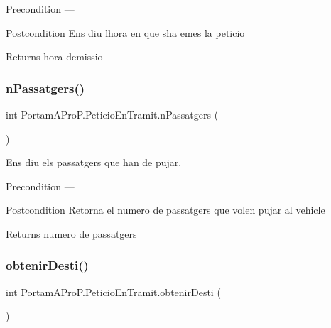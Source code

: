 \begin{DoxyPrecond}{Precondition}
--- 
\end{DoxyPrecond}
\begin{DoxyPostcond}{Postcondition}
Ens diu l\textquotesingle{}hora en que s\textquotesingle{}ha emes la peticio 
\end{DoxyPostcond}
\begin{DoxyReturn}{Returns}
hora d\textquotesingle{}emissio 
\end{DoxyReturn}
\mbox{\label{class_portam_a_pro_p_1_1_peticio_en_tramit_a544db471b12c35d6b8c234be757d84d3}} 
\subsubsection{\texorpdfstring{n\+Passatgers()}{nPassatgers()}}
{\footnotesize\ttfamily int Portam\+A\+Pro\+P.\+Peticio\+En\+Tramit.\+n\+Passatgers (\begin{DoxyParamCaption}{ }\end{DoxyParamCaption})}



Ens diu els passatgers que han de pujar. 

\begin{DoxyPrecond}{Precondition}
--- 
\end{DoxyPrecond}
\begin{DoxyPostcond}{Postcondition}
Retorna el numero de passatgers que volen pujar al vehicle 
\end{DoxyPostcond}
\begin{DoxyReturn}{Returns}
numero de passatgers 
\end{DoxyReturn}
\mbox{\label{class_portam_a_pro_p_1_1_peticio_en_tramit_a7ab6e34a00489297a71dbe9ccae4aa51}} 
\subsubsection{\texorpdfstring{obtenir\+Desti()}{obtenirDesti()}}
{\footnotesize\ttfamily int Portam\+A\+Pro\+P.\+Peticio\+En\+Tramit.\+obtenir\+Desti (\begin{DoxyParamCaption}{ }\end{DoxyParamCaption})}



